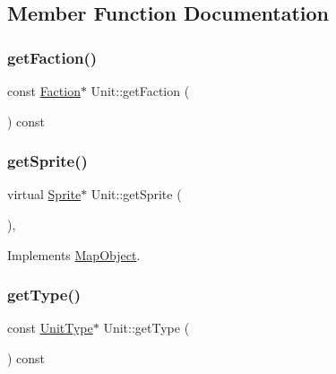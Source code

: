 \subsection{Member Function Documentation}
\mbox{\label{class_unit_a4e5ae48d922e36ec64e3a9b5424edc6d}} 
\subsubsection{\texorpdfstring{get\+Faction()}{getFaction()}}
{\footnotesize\ttfamily const \hyperlink{class_faction}{Faction}$\ast$ Unit\+::get\+Faction (\begin{DoxyParamCaption}{ }\end{DoxyParamCaption}) const\hspace{0.3cm}{\ttfamily [inline]}}

\mbox{\label{class_unit_ad45ef5ba23edfa7a1f598a65629eb3e8}} 
\subsubsection{\texorpdfstring{get\+Sprite()}{getSprite()}}
{\footnotesize\ttfamily virtual \hyperlink{class_sprite}{Sprite}$\ast$ Unit\+::get\+Sprite (\begin{DoxyParamCaption}{ }\end{DoxyParamCaption})\hspace{0.3cm}{\ttfamily [inline]}, {\ttfamily [virtual]}}



Implements \hyperlink{class_map_object_a3881fea264291ba07e0172d1cd3246cc}{Map\+Object}.

\mbox{\label{class_unit_a6682f776bb4ad9aae1f32e849eed4137}} 
\subsubsection{\texorpdfstring{get\+Type()}{getType()}}
{\footnotesize\ttfamily const \hyperlink{class_unit_type}{Unit\+Type}$\ast$ Unit\+::get\+Type (\begin{DoxyParamCaption}{ }\end{DoxyParamCaption}) const\hspace{0.3cm}{\ttfamily [inline]}}



